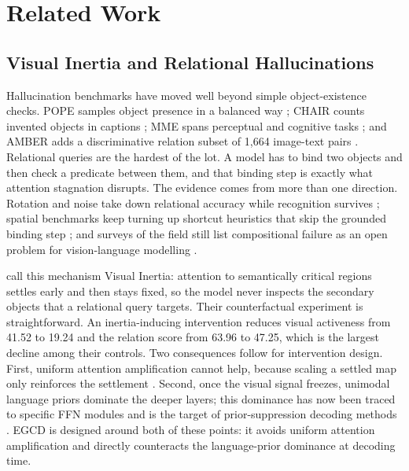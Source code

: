\documentclass{ieeeaccess}
\begin{document}
\section{Related Work}\label{sec:related}

\subsection{Visual Inertia and Relational Hallucinations}\label{subsec:visual-inertia}

Hallucination benchmarks have moved well beyond simple object-existence checks. POPE samples object presence in a balanced way \cite{li2023bevaluating}; CHAIR counts invented objects in captions \cite{rohrbach2018object}; MME spans perceptual and cognitive tasks \cite{fu2025mme}; and AMBER adds a discriminative relation subset of 1,664 image-text pairs \cite{wang2023amber}. Relational queries are the hardest of the lot. A model has to bind two objects and then check a predicate between them, and that binding step is exactly what attention stagnation disrupts. The evidence comes from more than one direction. Rotation and noise take down relational accuracy while recognition survives \cite{shin2026when}; spatial benchmarks keep turning up shortcut heuristics that skip the grounded binding step \cite{brown2025hallucination}; and surveys of the field still list compositional failure as an open problem for vision-language modelling \cite{bordes2024introvlm}.

\cite{gong2026attention} call this mechanism Visual Inertia: attention to semantically critical regions settles early and then stays fixed, so the model never inspects the secondary objects that a relational query targets. Their counterfactual experiment is straightforward. An inertia-inducing intervention reduces visual activeness from 41.52 to 19.24 and the relation score from 63.96 to 47.25, which is the largest decline among their controls. Two consequences follow for intervention design. First, uniform attention amplification cannot help, because scaling a settled map only reinforces the settlement \cite{gong2026attention,chen2026mitigating}. Second, once the visual signal freezes, unimodal language priors dominate the deeper layers; this dominance has now been traced to specific FFN modules \cite{guo2026fade} and is the target of prior-suppression decoding methods \cite{ren2026nolan,min2025mitigating}. EGCD is designed around both of these points: it avoids uniform attention amplification and directly counteracts the language-prior dominance at decoding time.
\end{document}
